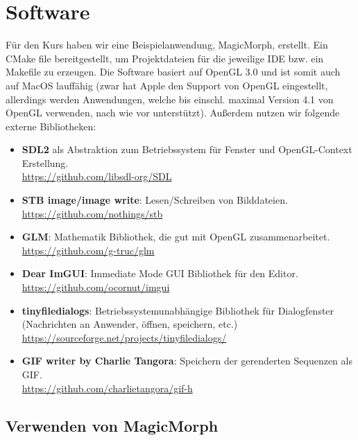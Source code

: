 \chapter{Software}

Für den Kurs haben wir eine Beispielanwendung, MagicMorph, erstellt.
Ein CMake file bereitgestellt, um Projektdateien für die jeweilige IDE
bzw. ein Makefile zu erzeugen. Die Software basiert
auf OpenGL 3.0 und ist somit auch auf MacOS lauffähig (zwar hat Apple
den Support von OpenGL eingestellt, allerdings werden Anwendungen, welche bis
einschl. maximal Version 4.1 von OpenGL verwenden, nach wie vor unterstützt).
Au\ss erdem nutzen wir folgende externe Bibliotheken:

\begin{itemize}
	\item \textbf{SDL2} als Abstraktion zum Betriebssystem für Fenster und OpenGL-Context Erstellung.
	\\\href{https://github.com/libsdl-org/SDL}{https://github.com/libsdl-org/SDL} 
	\item \textbf{STB image/image write}: Lesen/Schreiben von Bilddateien.
		\\\href{https://github.com/nothings/stb}{https://github.com/nothings/stb} 
	\item \textbf{GLM}: Mathematik Bibliothek, die gut mit OpenGL zusammenarbeitet. 
			\\\href{https://github.com/g-truc/glm}{https://github.com/g-truc/glm}
	\item \textbf{Dear ImGUI}: Immediate Mode GUI Bibliothek für den Editor. 
	\\\href{https://github.com/ocornut/imgui}{https://github.com/ocornut/imgui}
	\item \textbf{tinyfiledialogs}: Betriebssystemunabhängige Bibliothek für Dialogfenster (Nachrichten an Anwender, öffnen, speichern, etc.)	\\\href{https://sourceforge.net/projects/tinyfiledialogs/}{https://sourceforge.net/projects/tinyfiledialogs/}
	\item \textbf{GIF writer by Charlie Tangora}: Speichern der gerenderten Sequenzen als GIF.
				\\\href{https://github.com/charlietangora/gif-h}{https://github.com/charlietangora/gif-h} 
\end{itemize}

\section{Verwenden von MagicMorph}

